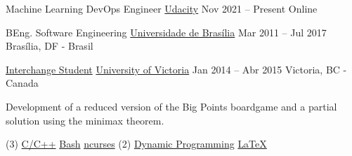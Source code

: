 \par
{}

\cveducation
{Machine Learning DevOps Engineer}
{\href{https://www.udacity.com/course/machine-learning-dev-ops-engineer-nanodegree--nd0821}{Udacity}}
{Nov 2021 -- Present}
{Online}

\bigskip

\cveducation
{BEng. Software Engineering}
{\href{https://fga.unb.br/software}{Universidade de Brasília}}
{Mar 2011 -- Jul 2017}
{Brasília, DF - Brasil}

\smallskip

\cveducation
{\footnotesize\faExchange\hspace{0.7em}\small\mdseries\href{http://www.cienciasemfronteiras.gov.br/web/csf/o-programa}{Interchange Student}}
{\href{https://www.uvic.ca/}{University of Victoria}}
{Jan 2014 -- Abr 2015}
{Victoria, BC - Canada}
\smallskip


\bigskip



{\smallskip\justifying
	{\faAngleRight} {\color{description}Development of a reduced version of the Big Points boardgame and a partial solution using the minimax theorem.}
\par}

\vspace{-0.5mm}
\begin{tasks}[after-item-skip=-0.5mm, label-offset=0.5mm, item-indent=5.0mm, label-align=left, label={\scriptsize\faCode}, label-format={\scriptsize\color{tech}}, item-format={\bfseries\footnotesize\color{emphasis}}](3)
	\task \href{https://www.cplusplus.com/}{C/C++}
	\task \href{https://www.gnu.org/software/bash/}{Bash}
	\task \href{https://invisible-island.net/ncurses/announce.html}{ncurses}
	\task*(2) \href{https://en.wikipedia.org/wiki/Dynamic_programming}{Dynamic Programming}
	\task \href{http://www.scrummanifesto.org/}{\LaTeX}
\end{tasks}

\bigskip

